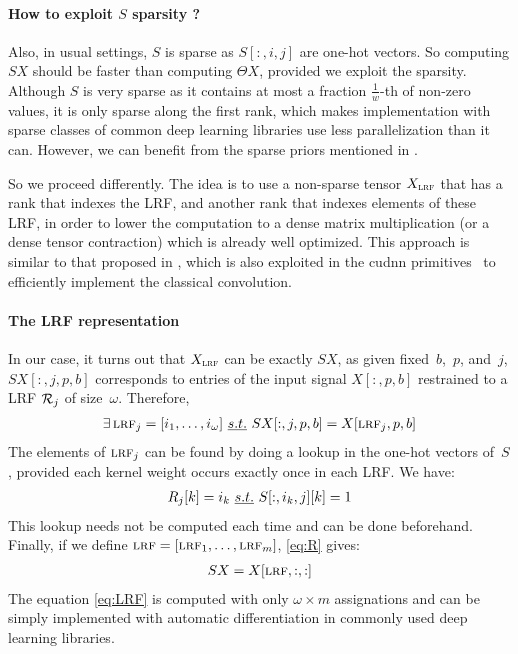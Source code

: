 \paragraph{How to exploit $S$ sparsity ?}
Also, in usual settings, $S$ is sparse as $S[:,i,j]$ are one-hot vectors. So computing $SX$ should be faster than computing $\Theta X$, provided we exploit the sparsity. Although $S$ is very sparse as it contains at most a fraction $\frac{1}{w}$-th of non-zero values, it is only sparse along the first rank, which makes implementation with sparse classes of common deep learning libraries use less parallelization than it can. However, we can benefit from the sparse priors mentioned in .%

So we proceed differently. The idea is to use a non-sparse tensor $X_{\operatorname{\textsc{lrf}}}$ that has a rank that indexes the LRF, and another rank that indexes elements of these LRF, in order to lower the computation to a dense matrix multiplication (or a dense tensor contraction) which is already well optimized. This approach is similar to that proposed in \cite{chellapilla2006high}, which is also exploited in the cudnn primitives~\citep{chetlur2014cudnn} to efficiently implement the classical convolution.

\paragraph{The LRF representation}
In our case, it turns out that $X_{\operatorname{\textsc{lrf}}}$ can be exactly $SX$, as given fixed~$b$,~$p$, and~$j$, $SX[:,j,p,b]$ corresponds to entries of the input signal $X[:,p,b]$ restrained to a LRF $\mathcal{R}_j$ of size~$\omega$. Therefore,
\begin{gather}
\exists \operatorname{\textsc{lrf}}_j = [i_1, \ldots, i_\omega]~\emph{s.t.}~ SX[:,j,p,b] = X[\operatorname{\textsc{lrf}}_j, p, b]
\label{eq:R}
\end{gather}
The elements of $\operatorname{\textsc{lrf}}_j$ can be found by doing a lookup in the one-hot vectors of~$S$, provided each kernel weight occurs exactly once in each LRF. We have:
\begin{gather}
R_j[k] = i_k~\emph{s.t.}~ S[:,i_k,j][k] = 1
\end{gather}
This lookup needs not be computed each time and can be done beforehand. Finally, if we define $\operatorname{\textsc{lrf}} = [\operatorname{\textsc{lrf}}_1, \ldots, \operatorname{\textsc{lrf}}_m]$, \eqref{eq:R} gives:
\begin{gather}
SX = X[\operatorname{\textsc{lrf}}, :, :]
\label{eq:LRF}
\end{gather}
The equation \eqref{eq:LRF} is computed with only $\omega \times m$ assignations and can be simply implemented with automatic differentiation in commonly used deep learning libraries.

